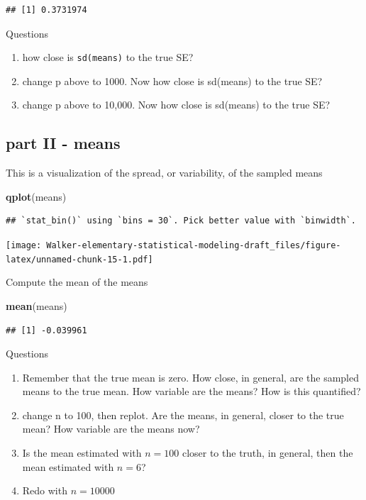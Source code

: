 \documentclass[]{book}
\newenvironment{Shaded}{\begin{snugshade}}{\end{snugshade}}
\newcommand{\KeywordTok}[1]{\textcolor[rgb]{0.13,0.29,0.53}{\textbf{#1}}}
\newcommand{\NormalTok}[1]{#1}
\providecommand{\tightlist}{%
  \setlength{\itemsep}{0pt}\setlength{\parskip}{0pt}}
\begin{document}
\begin{verbatim}
## [1] 0.3731974
\end{verbatim}

Questions

\begin{enumerate}
\def\labelenumi{\arabic{enumi}.}
\tightlist
\item
  how close is \texttt{sd(means)} to the true SE?
\item
  change p above to 1000. Now how close is sd(means) to the true SE?
\item
  change p above to 10,000. Now how close is sd(means) to the true SE?
\end{enumerate}

\subsection{part II - means}\label{part-ii---means}

This is a visualization of the spread, or variability, of the sampled
means

\begin{Shaded}
\begin{Highlighting}[]
\KeywordTok{qplot}\NormalTok{(means)}
\end{Highlighting}
\end{Shaded}

\begin{verbatim}
## `stat_bin()` using `bins = 30`. Pick better value with `binwidth`.
\end{verbatim}

\texttt{[image: Walker-elementary-statistical-modeling-draft\_files/figure-latex/unnamed-chunk-15-1.pdf]}

Compute the mean of the means

\begin{Shaded}
\begin{Highlighting}[]
\KeywordTok{mean}\NormalTok{(means)}
\end{Highlighting}
\end{Shaded}

\begin{verbatim}
## [1] -0.039961
\end{verbatim}

Questions

\begin{enumerate}
\def\labelenumi{\arabic{enumi}.}
\tightlist
\item
  Remember that the true mean is zero. How close, in general, are the
  sampled means to the true mean. How variable are the means? How is
  this quantified?
\item
  change n to 100, then replot. Are the means, in general, closer to the
  true mean? How variable are the means now?
\item
  Is the mean estimated with \(n=100\) closer to the truth, in general,
  then the mean estimated with \(n=6\)?
\item
  Redo with \(n=10000\)
\end{enumerate}
\end{document}
